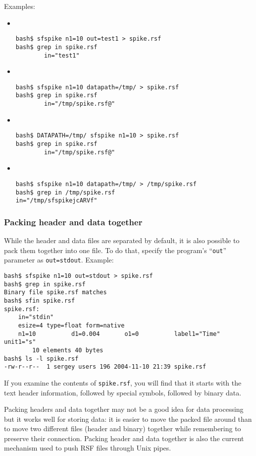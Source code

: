 Examples:
\begin{itemize}
\item \ \\
\begin{verbatim}
bash$ sfspike n1=10 out=test1 > spike.rsf
bash$ grep in spike.rsf
        in="test1"
\end{verbatim}
\item \ \\
\begin{verbatim}
bash$ sfspike n1=10 datapath=/tmp/ > spike.rsf
bash$ grep in spike.rsf
        in="/tmp/spike.rsf@"
\end{verbatim}
\item \ \\
\begin{verbatim}
bash$ DATAPATH=/tmp/ sfspike n1=10 > spike.rsf
bash$ grep in spike.rsf
        in="/tmp/spike.rsf@"
\end{verbatim}
\item \ \\
\begin{verbatim}
bash$ sfspike n1=10 datapath=/tmp/ > /tmp/spike.rsf
bash$ grep in /tmp/spike.rsf
in="/tmp/sfspikejcARVf"
\end{verbatim}
\end{itemize}

\subsubsection{Packing header and data together}

While the header and data files are separated by default, it is also possible
to pack them together into one file. To do that, specify the program's
``\texttt{out}'' parameter as \texttt{out=stdout}. Example:
\begin{verbatim}
bash$ sfspike n1=10 out=stdout > spike.rsf
bash$ grep in spike.rsf
Binary file spike.rsf matches
bash$ sfin spike.rsf
spike.rsf:
    in="stdin"
    esize=4 type=float form=native
    n1=10          d1=0.004       o1=0          label1="Time" unit1="s"
        10 elements 40 bytes
bash$ ls -l spike.rsf
-rw-r--r--  1 sergey users 196 2004-11-10 21:39 spike.rsf
\end{verbatim}
If you examine the contents of \texttt{spike.rsf}, you will find that it
starts with the text header information, followed by special
symbols, followed by binary data. 

Packing headers and data together may not be a good idea for data processing
but it works well for storing data: it is easier to move the packed file
around than to move two different files (header and binary) together while
remembering to preserve their connection. Packing header and data together is
also the current mechanism used to push RSF files through Unix pipes.

